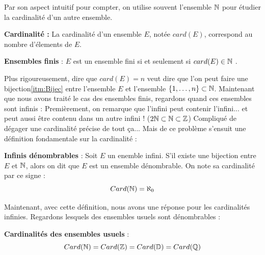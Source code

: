 Par son aspect intuitif pour compter, on utilise souvent l'ensemble $\mathbb{N}$ pour étudier la cardinalité d'un autre ensemble.

\begin{definition}
\textbf{Cardinalité :} \newline
La cardinalité d'un ensemble $E$, notée $card(E)$, correspond au nombre d'élements de $E$.
\end{definition}

\begin{corollary}
\textbf{Ensembles finis} : \newline
$E$ est un ensemble fini si et seulement si $card(E) \in \mathbb{N}$ .
\end{corollary}

Plus rigoureusement, dire que $card(E)=n$ veut dire que l'on peut faire une bijection\ref{itm:Bijec} entre l'ensemble $E$ et l'ensemble $\{1, \ldots ,n\} \subset \mathbb{N}$. \newline
\newline
Maintenant que nous avons traité le cas des ensembles finis, regardons quand ces ensembles sont infinis : \newline
\newline
Premièrement, on remarque que l'infini peut contenir l'infini... et peut aussi être contenu dans un autre infini ! ($2\mathbb{N} \subset \mathbb{N} \subset \mathbb{Z}$) \newline
Compliqué de dégager une cardinalité précise de tout ça... \newline
Mais de ce problème s'ensuit une définition fondamentale sur la cardinalité :

\begin{definition}
\textbf{Infinis dénombrables} : \newline
Soit $E$ un enemble infini. S'il existe une bijection entre $E$ et $\mathbb{N}$, alors on dit que $E$ est un ensemble dénombrable.
On note sa cardinalité par ce signe :
$$Card(\mathbb{N}) = \aleph_0$$
\end{definition}

Maintenant, avec cette définition, nous avons une réponse pour les cardinalités infinies. \newline
Regardons lesquels des ensembles usuels sont dénombrables :

\begin{theorem}
\label{thm:CrdEnU}
\textbf{Cardinalités des ensembles usuels} : \newline
$$Card(\mathbb{N})=Card(\mathbb{Z})=Card(\mathbb{D})=Card(\mathbb{Q})$$
\end{theorem}

